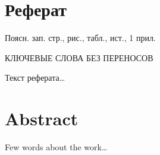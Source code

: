 \documentclass[../main]{subfiles}
\begin{document}
\newpage
{}
\section*{Реферат}

\setcounter{page}{2}

Поясн. зап.  стр.,   рис.,  табл.,  ист., 1 прил.

\begin{jje}
    \MakeUppercase{ключевые слова без переносов}
\end{jje}
Текст реферата\dots

\newpage
\section*{Abstract}

\indent
\begin{english}
    Few words about the work\dots
\end{english}
\end{document}
